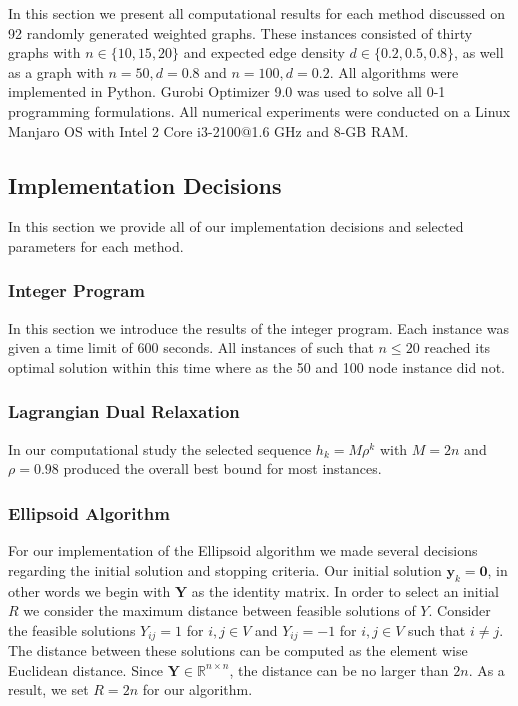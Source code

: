 \documentclass[12pt]{article}
\theoremstyle{plain}
\theoremstyle{definition}
\begin{document}
In this section we present all computational results for each method discussed on 92 randomly generated weighted graphs. These instances consisted of thirty graphs with $n \in \lbrace 10, 15, 20\rbrace$ and expected edge density $d \in \lbrace 0.2, 0.5, 0.8 \rbrace$, as well as a graph with $n=50, d = 0.8$ and $n= 100, d= 0.2$. All algorithms were implemented in Python. Gurobi Optimizer 9.0 was used to solve all 0-1 programming formulations. All numerical experiments were conducted on a Linux Manjaro OS with Intel 2 Core i3-2100$@$1.6 GHz and 8-GB RAM.

\subsection{Implementation Decisions}

In this section we provide all of our implementation decisions and selected parameters for each method. 

\subsubsection{Integer Program}

In this section we introduce the results of the integer program. Each instance was given a time limit of 600 seconds. All instances of such that $n \leq 20$ reached its optimal solution within this time where as the 50 and 100 node instance did not. 


\subsubsection{Lagrangian Dual Relaxation}

In our computational study the selected sequence $h_k = M \rho^k$ with $M = 2n$ and $\rho = 0.98$ produced the overall best bound for most instances.

\subsubsection{Ellipsoid Algorithm} 

For our implementation of the Ellipsoid algorithm we made several decisions regarding the initial solution and stopping criteria. Our initial solution $\mathbf{y}_k =\mathbf{0}$, in other words we begin with $\mathbf{Y}$ as the identity matrix. In order to select an initial $R$ we consider the maximum distance between feasible solutions of $Y$. Consider the feasible solutions $Y_{ij} = 1$ for $i,j \in V$ and $Y_{ij} = -1$ for $i,j \in V$ such that $i \neq j$. The distance between these solutions can be computed as the element wise Euclidean distance. Since $\mathbf{Y} \in \mathbb{R}^{n \times n}$, the distance can be no larger than $2n$. As a result, we set $R = 2n$ for our algorithm.
\end{document}
